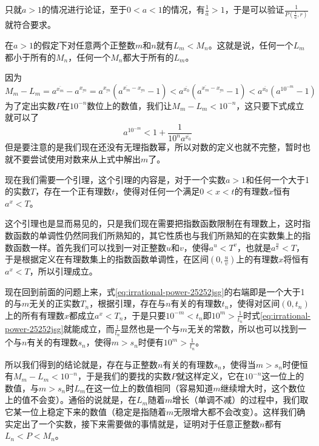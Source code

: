 只就$a>1$的情况进行论证，至于$0<a<1$的情况，有$\frac{1}{a}>1$，于是可以验证$\frac{1}{P(\frac{1}{a},r)}$就符合要求。

在$a>1$的假定下对任意两个正整数$m$和$n$就有$L_m<M_n$。这就是说，任何一个$L_m$都小于所有的$M_n$，任何一个$M_n$都大于所有的$L_m$。

因为
\begin{equation*}
  M_m-L_m = a^{\overline{x_m}}-a^{\underline{x_m}}
  = a^{\underline{x_m}}(a^{\overline{x_m}-\underline{x_m}}-1)
  < a^{\overline{x_0}}(a^{\overline{x_m}-\underline{x_m}}-1)
  < a^{\overline{x_0}}(a^{10^{-m}}-1)
\end{equation*}
为了定出实数$P$在$10^{-n}$数位上的数值，我们让$M_m-L_m<10^{-n}$，这只要下式成立就可以了
\begin{equation}
  \label{eq:irrational-power-25252jsg}
  a^{10^{-m}} < 1 + \frac{1}{10^na^{\overline{x_0}}}
\end{equation}
但是要注意的是我们现在还没有无理指数幂，所以对数的定义也就不完整，暂时也就不要尝试使用对数来从上式中解出$m$了。

现在我们需要一个引理，这个引理的内容是，对于一个实数$a>1$和任何一个大于1的实数$T$，存在一个正有理数$t$，使得对任何一个满足$0<x<t$的有理数$x$恒有$a^x<T$。

这个引理也是显而易见的，只是我们现在需要把指数函数限制在有理数上，这时指数函数的单调性仍然同我们所熟知的，其它性质也与我们所熟知的在实数集上的指数函数一样。首先我们可以找到一对正整数$u$和$v$，使得$a^u<T^v$，也就是$a^{\frac{u}{v}}<T$，于是根据定义在有理数集上的指数函数单调性，在区间$(0,\frac{u}{v})$上的有理数$x$将恒有$a^x<T$，所以引理成立。

现在回到前面的问题上来，式\ref{eq:irrational-power-25252jsg}的右端即是一个大于1的与$m$无关的正实数$T_n$，根据引理，存在与$n$有关的有理数$t_n$，使得对区间$(0,t_n)$上的所有有理数$x$都成立$a^x<T_n$，于是只要$10^{-m}<t_n$即$10^m>\frac{1}{t_n}$时式\ref{eq:irrational-power-25252jsg}就能成立，而$\frac{1}{t_n}$显然也是一个与$m$无关的常数，所以也可以找到一个与$n$有关的有理数$s_n$，使得$m>s_n$时便有$10^m>\frac{1}{t_n}$。

所以我们得到的结论就是，存在与正整数$n$有关的有理数$s_n$，使得当$m>s_n$时便恒有$M_m-L_m<10^{-n}$，于是我们的要找的实数$P$就这样定义，它在$10^{-n}$这一位上的数值，与$m>s_n$时$L_m$在这一位上的数值相同（容易知道$m$继续增大时，这个数位上的值不会变）。通俗的说就是，在$L_m$随着$m$增长（单调不减）的过程中，我们取它某一位上稳定下来的数值（稳定是指随着$m$无限增大都不会改变）。这样我们确实定出了一个实数，接下来需要做的事情就是，证明对于任意正整数$n$都有$L_n<P<M_n$。

